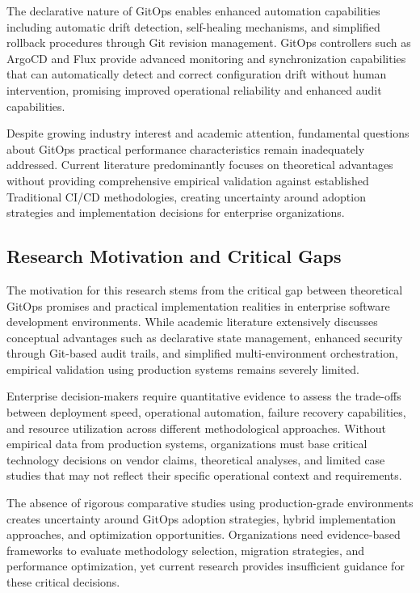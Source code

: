 The declarative nature of GitOps enables enhanced automation capabilities including automatic drift detection, self-healing mechanisms, and simplified rollback procedures through Git revision management. GitOps controllers such as ArgoCD and Flux provide advanced monitoring and synchronization capabilities that can automatically detect and correct configuration drift without human intervention, promising improved operational reliability and enhanced audit capabilities.

Despite growing industry interest and academic attention, fundamental questions about GitOps practical performance characteristics remain inadequately addressed. Current literature predominantly focuses on theoretical advantages without providing comprehensive empirical validation against established Traditional CI/CD methodologies, creating uncertainty around adoption strategies and implementation decisions for enterprise organizations.

\subsection{Research Motivation and Critical Gaps}
The motivation for this research stems from the critical gap between theoretical GitOps promises and practical implementation realities in enterprise software development environments. While academic literature extensively discusses conceptual advantages such as declarative state management, enhanced security through Git-based audit trails, and simplified multi-environment orchestration, empirical validation using production systems remains severely limited.

Enterprise decision-makers require quantitative evidence to assess the trade-offs between deployment speed, operational automation, failure recovery capabilities, and resource utilization across different methodological approaches. Without empirical data from production systems, organizations must base critical technology decisions on vendor claims, theoretical analyses, and limited case studies that may not reflect their specific operational context and requirements.

The absence of rigorous comparative studies using production-grade environments creates uncertainty around GitOps adoption strategies, hybrid implementation approaches, and optimization opportunities. Organizations need evidence-based frameworks to evaluate methodology selection, migration strategies, and performance optimization, yet current research provides insufficient guidance for these critical decisions.

